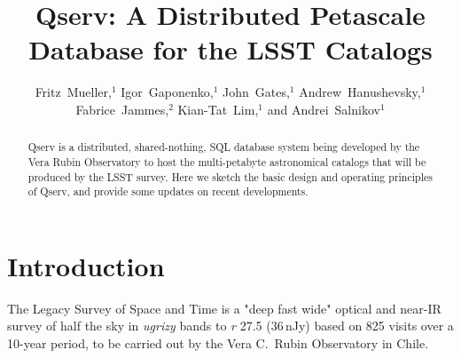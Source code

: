 \documentclass[11pt,twoside]{article}
\begin{document}

\title{Qserv: A Distributed Petascale Database for the LSST Catalogs}

\author{Fritz~Mueller,$^1$ Igor~Gaponenko,$^1$ John~Gates,$^1$ Andrew~Hanushevsky,$^1$ Fabrice~Jammes,$^2$ Kian-Tat~Lim,$^1$ and Andrei~Salnikov$^1$ }

\begin{abstract}
Qserv is a distributed, shared-nothing, SQL database system being developed by the Vera Rubin Observatory to
host the multi-petabyte astronomical catalogs that will be produced by the LSST survey.  Here we sketch the
basic design and operating principles of Qserv, and provide some updates on recent developments.
\end{abstract}

\section{Introduction}

The Legacy Survey of Space and Time \citep{2019ApJ...873..111I} is a "deep fast wide" optical and near-IR
survey of half the sky in \emph{ugrizy} bands to \emph{r} 27.5 (36\,nJy) based on 825 visits over a 10-year
period, to be carried out by the Vera C.\ Rubin Observatory in Chile.
\end{document}
